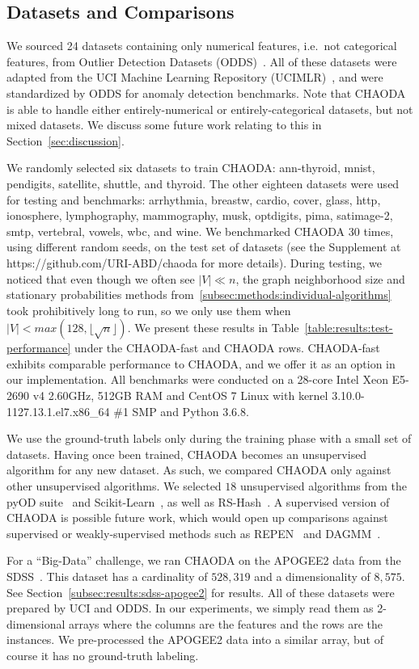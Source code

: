 \subsection{Datasets and Comparisons}
\label{subsec:methods:datasets-and-comparisons}

We sourced 24 datasets containing only numerical features, i.e.\ not categorical features, from Outlier Detection Datasets (ODDS)~\cite{rayana2016odds}.
All of these datasets were adapted from the UCI Machine Learning Repository (UCIMLR)~\cite{UCIMLR}, and were standardized by ODDS for anomaly detection benchmarks.
Note that CHAODA is able to handle either entirely-numerical or entirely-categorical datasets, but not mixed datasets.
We discuss some future work relating to this in Section~\ref{sec:discussion}.

We randomly selected six datasets to train CHAODA: ann-thyroid, mnist, pendigits, satellite, shuttle, and thyroid.
The other eighteen datasets were used for testing and benchmarks: arrhythmia, breastw, cardio, cover, glass, http, ionosphere, lymphography, mammography, musk, optdigits, pima, satimage-2, smtp, vertebral, vowels, wbc, and wine.
We benchmarked CHAODA 30 times, using different random seeds, on the test set of datasets (see the Supplement at https://github.com/URI-ABD/chaoda for more details).
During testing, we noticed that even though we often see $|V| \ll n $, the graph neighborhood size and stationary probabilities methods from~\ref{subsec:methods:individual-algorithms} took prohibitively long to run, so we only use them when $|V| < max(128, \lfloor \sqrt n \rfloor)$.
We present these results in Table~\ref{table:results:test-performance} under the CHAODA-fast and CHAODA rows.
CHAODA-fast exhibits comparable performance to CHAODA, and we offer it as an option in our implementation.
All benchmarks were conducted on a 28-core Intel Xeon E5-2690 v4 2.60GHz, 512GB RAM and CentOS 7 Linux with kernel 3.10.0-1127.13.1.el7.x86\_64 \#1 SMP and Python 3.6.8.

We use the ground-truth labels only during the training phase with a small set of datasets.
Having once been trained, CHAODA becomes an unsupervised algorithm for any new dataset.
As such, we compared CHAODA only against other unsupervised algorithms.
We selected $18$ unsupervised algorithms from the pyOD suite~\cite{zhao2019pyod} and Scikit-Learn~\cite{pedregosa2011scikit}, as well as RS-Hash~\cite{sathe2016subspace}.
A supervised version of CHAODA is possible future work, which would open up comparisons against supervised or weakly-supervised methods such as REPEN~\cite{pang2018learning} and DAGMM~\cite{zong2018deep}.

For a ``Big-Data'' challenge, we ran CHAODA on the APOGEE2 data from the SDSS~\cite{blanton2017sdss}.
This dataset has a cardinality of $528,319$ and a dimensionality of $8,575$.
See Section~\ref{subsec:results:sdss-apogee2} for results.
All of these datasets were prepared by UCI and ODDS. 
In our experiments, we simply read them as 2-dimensional arrays where the columns are the features and the rows are the instances. 
We pre-processed the APOGEE2 data into a similar array, but of course it has no ground-truth labeling.
